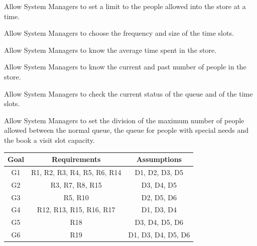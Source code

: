 \begin{enumerate}[label={[R\arabic*]}]
    \item Allow System Managers to set a limit to the people allowed into the store at a time.
    \item Allow System Managers to choose the frequency and size of the time slots.
    \item Allow System Managers to know the average time spent in the store.
    \item Allow System Managers to know the current and past number of people in the store.
    \item Allow System Managers to check the current status of the queue and of the time slots.
    \item Allow System Managers to set the division of the maximum number of people allowed between the normal queue, the queue for people with special needs and the book a visit slot capacity.
    
\end{enumerate}

\begin{center}
    \begin{tabular}{ |c||c|c| }
        \hline
        \textbf{Goal} & \textbf{Requirements} & \textbf{Assumptions} \\
        \hline
        G1 & R1, R2, R3, R4, R5, R6, R14 & D1, D2, D3, D5 \\ %
        \hline
        G2 & R3, R7, R8, R15 & D3, D4, D5 \\ %
        \hline
        G3 & R5, R10 & D2, D5, D6\\ %
        \hline
        G4 & R12, R13, R15, R16, R17 & D1, D3, D4 \\ %
        \hline
        G5 & R18 & D3, D4, D5, D6 \\ %
        \hline
        G6 & R19 & D1, D3, D4, D5, D6 \\ %
        \hline
    \end{tabular}
\end{center}

